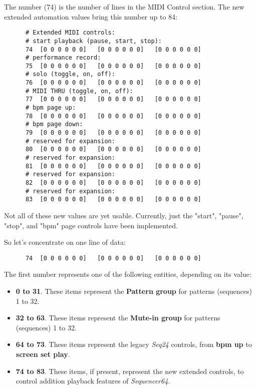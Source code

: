    The number (74) is the number of lines in the MIDI Control section.
   The new extended automation values bring this number up to 84:

   \begin{verbatim}
      # Extended MIDI controls:
      # start playback (pause, start, stop):
      74  [0 0 0 0 0 0]   [0 0 0 0 0 0]   [0 0 0 0 0 0]
      # performance record:
      75  [0 0 0 0 0 0]   [0 0 0 0 0 0]   [0 0 0 0 0 0]
      # solo (toggle, on, off):
      76  [0 0 0 0 0 0]   [0 0 0 0 0 0]   [0 0 0 0 0 0]
      # MIDI THRU (toggle, on, off):
      77  [0 0 0 0 0 0]   [0 0 0 0 0 0]   [0 0 0 0 0 0]
      # bpm page up:
      78  [0 0 0 0 0 0]   [0 0 0 0 0 0]   [0 0 0 0 0 0]
      # bpm page down:
      79  [0 0 0 0 0 0]   [0 0 0 0 0 0]   [0 0 0 0 0 0]
      # reserved for expansion:
      80  [0 0 0 0 0 0]   [0 0 0 0 0 0]   [0 0 0 0 0 0]
      # reserved for expansion:
      81  [0 0 0 0 0 0]   [0 0 0 0 0 0]   [0 0 0 0 0 0]
      # reserved for expansion:
      82  [0 0 0 0 0 0]   [0 0 0 0 0 0]   [0 0 0 0 0 0]
      # reserved for expansion:
      83  [0 0 0 0 0 0]   [0 0 0 0 0 0]   [0 0 0 0 0 0]
   \end{verbatim}

   Not all of these new values are yet usable.  Currently, just the
   "start", "pause", "stop", and "bpm" page controls have been implemented.

   So let's concentrate on one line of data:

   \begin{verbatim}
      74  [0 0 0 0 0 0]   [0 0 0 0 0 0]   [0 0 0 0 0 0]
   \end{verbatim}

   The first number represents one of the following entities, depending on its
   value:

   \begin{itemize}
      \item \textbf{0 to 31}.  These items represent the \textbf{Pattern group}
         for patterns (sequences) 1 to 32.
      \item \textbf{32 to 63}.  These items represent the \textbf{Mute-in
         group} for patterns (sequences) 1 to 32.
      \item \textbf{64 to 73}.  These items represent the legacy \textsl{Seq24}
         controls, from \textbf{bpm up} to \textbf{screen set play}.
      \item \textbf{74 to 83}.  These items, if present, represent the
         new extended controls, to control addition playback features of
         \textsl{Sequencer64}.
   \end{itemize}
   
